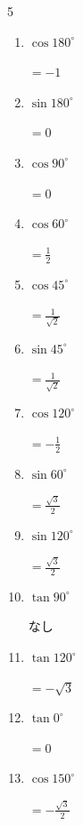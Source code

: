 \begin{multicols}{5}
\begin{enumerate}
  \item $\displaystyle \cos{180^\circ}$

        $\displaystyle =-1$

  \item $\displaystyle \sin{180^\circ}$

        $\displaystyle =0$

  \item $\displaystyle \cos{90^\circ}$

        $\displaystyle =0$

  \item $\displaystyle \cos{60^\circ}$

        $\displaystyle =\frac{1}{2}$

  \item $\displaystyle \cos{45^\circ}$

        $\displaystyle =\frac{1}{\sqrt{2}}$

  \item $\displaystyle \sin{45^\circ}$

        $\displaystyle =\frac{1}{\sqrt{2}}$

  \item $\displaystyle \cos{120^\circ}$

        $\displaystyle =-\frac{1}{2}$

  \item $\displaystyle \sin{60^\circ}$

        $\displaystyle =\frac{\sqrt{3}}{2}$

  \item $\displaystyle \sin{120^\circ}$

        $\displaystyle =\frac{\sqrt{3}}{2}$

  \item $\displaystyle \tan{90^\circ}$

        $\displaystyle なし$

  \item $\displaystyle \tan{120^\circ}$

        $\displaystyle =-\sqrt{3}$

  \item $\displaystyle \tan{0^\circ}$

        $\displaystyle =0$

  \item $\displaystyle \cos{150^\circ}$

        $\displaystyle =-\frac{\sqrt{3}}{2}$

\columnbreak %


\end{enumerate}
\end{multicols}
